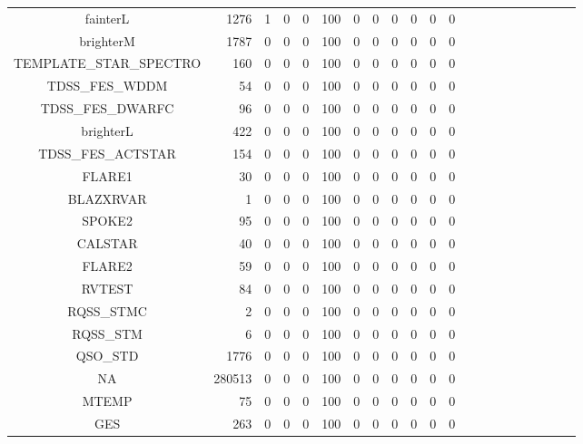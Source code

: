 \documentclass[onecolumn]{aa}
\begin{document}
\begin{center}
\begin{longtable}{c rrr rrr rrrrrrrrrrrrrr}
fainterL & 1276 & 1 & 0 & 0 & 100 & 0 & 0 & 0 & 0 & 0 & 0 \\ 
brighterM & 1787 & 0 & 0 & 0 & 100 & 0 & 0 & 0 & 0 & 0 & 0 \\ 
TEMPLATE\_STAR\_SPECTRO & 160 & 0 & 0 & 0 & 100 & 0 & 0 & 0 & 0 & 0 & 0 \\ 
TDSS\_FES\_WDDM & 54 & 0 & 0 & 0 & 100 & 0 & 0 & 0 & 0 & 0 & 0 \\ 
TDSS\_FES\_DWARFC & 96 & 0 & 0 & 0 & 100 & 0 & 0 & 0 & 0 & 0 & 0 \\ 
brighterL & 422 & 0 & 0 & 0 & 100 & 0 & 0 & 0 & 0 & 0 & 0 \\ 
TDSS\_FES\_ACTSTAR & 154 & 0 & 0 & 0 & 100 & 0 & 0 & 0 & 0 & 0 & 0 \\ 
FLARE1 & 30 & 0 & 0 & 0 & 100 & 0 & 0 & 0 & 0 & 0 & 0 \\ 
BLAZXRVAR & 1 & 0 & 0 & 0 & 100 & 0 & 0 & 0 & 0 & 0 & 0 \\ 
SPOKE2 & 95 & 0 & 0 & 0 & 100 & 0 & 0 & 0 & 0 & 0 & 0 \\ 
CALSTAR & 40 & 0 & 0 & 0 & 100 & 0 & 0 & 0 & 0 & 0 & 0 \\ 
FLARE2 & 59 & 0 & 0 & 0 & 100 & 0 & 0 & 0 & 0 & 0 & 0 \\ 
RVTEST & 84 & 0 & 0 & 0 & 100 & 0 & 0 & 0 & 0 & 0 & 0 \\ 
RQSS\_STMC & 2 & 0 & 0 & 0 & 100 & 0 & 0 & 0 & 0 & 0 & 0 \\ 
RQSS\_STM & 6 & 0 & 0 & 0 & 100 & 0 & 0 & 0 & 0 & 0 & 0 \\ 
QSO\_STD & 1776 & 0 & 0 & 0 & 100 & 0 & 0 & 0 & 0 & 0 & 0 \\ 
NA & 280513 & 0 & 0 & 0 & 100 & 0 & 0 & 0 & 0 & 0 & 0 \\ 
MTEMP & 75 & 0 & 0 & 0 & 100 & 0 & 0 & 0 & 0 & 0 & 0 \\ 
GES & 263 & 0 & 0 & 0 & 100 & 0 & 0 & 0 & 0 & 0 & 0 \\ 
\hline
\end{longtable}
\end{center}

\clearpage
\end{document}
